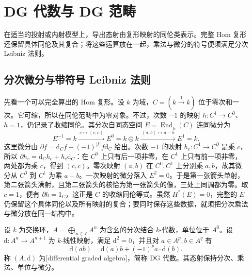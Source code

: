 
\section{DG 代数与 DG 范畴}
\label{b4:sec:2001}

在适当的投射或内射模型上，导出态射由复形映射的同伦类表示。完整 Hom 复形还保留具体同伦及其复合；将这些运算放在一起，乘法与微分的符号便须满足分次 Leibniz 法则。


%
%

\subsection{分次微分与带符号 Leibniz 法则}
\label{b4:subsec:2001:01}

先看一个可以完全算出的 Hom 复形。设 \(k\) 为域，\(C=(k\xrightarrow{1}k)\) 位于零次和一次。它可缩，所以在同伦范畴中为零对象。不过，次数 \(-1\) 的映射 \(h:C^1\to C^0\)、\(h=1\)，仍记录了收缩同伦。其分次自同态空间 \(E=\underline{\operatorname{End}}_k(C)\) 连同微分为
\[
	E^{-1}=k\xrightarrow{\ c\mapsto(c,c)\ }E^0=k\oplus k \xrightarrow{\ (a,b)\mapsto a-b\ }E^1=k.
\]
这里微分由 \(\partial f=\mathrm{d}_Cf-(-1)^{|f|}f\mathrm{d}_C\) 给出。次数 \(-1\) 的映射 \(h_c:C^1\to C^0\) 是乘 \(c\)，所以 \(\partial h_c=\mathrm{d}_Ch_c+h_c\mathrm{d}_C\)：在 \(C^0\) 上只有后一项非零，在 \(C^1\) 上只有前一项非零，两处都为乘 \(c\)，得到 \((c,c)\)。零次映射 \((a,b)\) 在 \(C^0,C^1\) 上分别乘 \(a,b\)，故其微分从 \(C^0\) 到 \(C^1\) 为乘 \(a-b\)。一次映射的微分落入 \(E^2=0\)。于是第一张箭头单射，第二张箭头满射，且第二张箭头的核恰为第一张箭头的像，三处上同调都为零。取 \(c=1\)，便有 \(\partial h=1_C\)，这正是 \(C\) 的收缩同伦等式。虽然 \(H^*(E)=0\)，完整的 \(E\) 仍保留这个具体同伦以及所有映射的复合；要同时保存这些数据，就须把分次乘法与微分放在同一结构中。

\begin{definition}\label{b4:def:dg-algebra}
	设 \(k\) 为交换环，\(A=\bigoplus_{n\in\mathbb Z}A^n\) 为含幺的分次结合 \(k\)-代数，单位位于 \(A^0\)。设 \(\mathrm{d}:A^n\to A^{n+1}\) 为 \(k\)-线性映射，满足 \(\mathrm{d}^2=0\)，并且对 \(a\in A^p,b\in A^q\) 有
	\[
		\mathrm{d}(ab)=\mathrm{d}(a)b+(-1)^p a\cdot\mathrm{d}(b).
	\]
	称 \((A,\mathrm{d})\) 为[differential graded algebra]，简称 DG 代数。其态射保持分次、乘法、单位与微分。
\end{definition}

